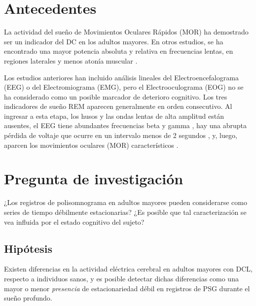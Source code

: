 \section{Antecedentes}

La actividad del sueño de Movimientos Oculares Rápidos (MOR) ha demostrado ser un indicador del DC en los adultos mayores. En otros estudios, se ha encontrado una mayor potencia absoluta y relativa en frecuencias lentas, en regiones laterales \cite{Brayet} y menos atonía muscular \cite{Chen}.

Los estudios anteriores han incluido análisis lineales del Electroencefalograma (EEG) o del Electromiograma (EMG), pero el Electrooculograma (EOG) no se ha considerado como un posible marcador de deterioro cognitivo. Los tres indicadores de sueño REM aparecen generalmente en orden consecutivo. Al ingresar a esta etapa, los husos y las ondas lentas de alta amplitud están ausentes, el EEG tiene abundantes frecuencias beta y gamma \cite{SteriadeIntracortical1996,Llinas}, hay una abrupta pérdida de voltaje que ocurre en un intervalo menos de 2 segundos \cite{Rosales-Lagarde2009}, y, luego, aparcen los movimientos oculares (MOR) característicos \cite{Aserinsky,AASM2007,Rechtshaffen1968}.


\section{Pregunta de investigación}

¿Los registros de polisomnograma en adultos mayores pueden considerarse como series de tiempo 
débilmente estacionarias?
%
¿Es posible que tal caracterización se vea influida por el estado cognitivo del sujeto?


\subsection{Hipótesis}

Existen diferencias en la actividad eléctrica cerebral en adultos mayores con DCL, respecto a 
individuos sanos, y es posible detectar dichas diferencias como una mayor o menor 
\textit{presencia} de estacionariedad débil en registros de PSG durante el sueño profundo.

